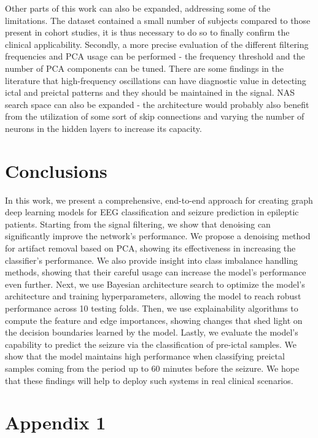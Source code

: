 \documentclass[a4paper,fleqn]{cas-sc}
\begin{document}
Other parts of this work can also be expanded, addressing some of the limitations.
The dataset contained a small number of subjects compared to those present in cohort studies, it is thus necessary to do so to finally confirm the clinical applicability. Secondly, a more precise evaluation of the different filtering frequencies and PCA usage can be performed - the frequency threshold and the number of PCA components can be tuned. There are some findings in the literature that high-frequency oscillations can have diagnostic value in detecting ictal and preictal patterns \cite{jung2019hfoepilepsy} and they should be maintained in the signal.
NAS search space can also be expanded - the architecture would probably also benefit from the utilization of some sort of skip connections and varying the number of neurons in the hidden layers to increase its capacity.



\section{Conclusions}

In this work, we present a comprehensive, end-to-end approach for creating graph deep learning models for EEG classification and seizure prediction in epileptic patients. Starting from the signal filtering, we show that denoising can significantly improve the network's performance. We propose a denoising method for artifact removal based on PCA, showing its effectiveness in increasing the classifier's performance. We also provide insight into class imbalance handling methods, showing that their careful usage can increase the model's performance even further. Next, we use Bayesian architecture search to optimize the model's architecture and training hyperparameters, allowing the model to reach robust performance across 10 testing folds. Then, we use explainability algorithms to compute the feature and edge importances, showing changes that shed light on the decision boundaries learned by the model. Lastly, we evaluate the model's capability to predict the seizure via the classification of pre-ictal samples. We show that the model maintains high performance when classifying preictal samples coming from the period up to 60 minutes before the seizure. We hope that these findings will help to deploy such systems in real clinical scenarios.

\appendix

\section{Appendix 1}
\label{chapter:appendix-1}
\end{document}
